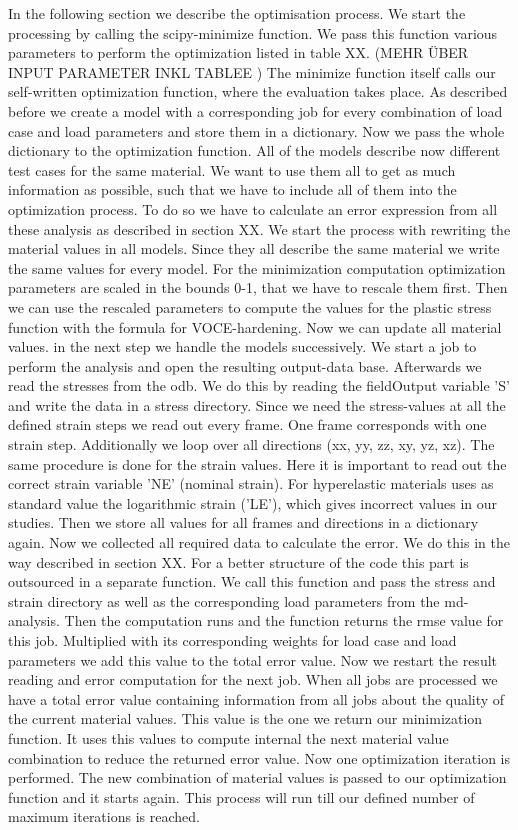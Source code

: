     In the following section we describe the optimisation process. We start the processing by calling the scipy-minimize function. We pass this function various parameters to perform the optimization listed in table XX. (MEHR ÜBER INPUT PARAMETER INKL TABLEE ) The minimize function itself calls our self-written optimization function, where the evaluation takes place. As described before we create a model with a corresponding job for every combination of load case and load parameters and store them in a dictionary. Now we pass the whole dictionary to the optimization function. All of the models describe now different test cases for the same material. We want to use them all to get as much information as possible, such that we have to include all of them into the optimization process. To do so we have to calculate an error expression from all these analysis as described in section XX. 
    We start the process with rewriting the material values in all models. Since they all describe the same material we write the same values for every model. For the minimization computation optimization parameters are scaled in the bounds 0-1, that we have to rescale them first. Then we can use the rescaled parameters to compute the values for the plastic stress function with the formula for VOCE-hardening. Now we can update all material values. in the next step we handle the models successively. We start a job to perform the  analysis and open the resulting output-data base. Afterwards we read the stresses from the odb. We do this by reading the fieldOutput variable 'S' and write the data in a stress directory. Since we need the stress-values at all the defined strain steps we read out every frame. One frame corresponds with one strain step. Additionally we loop over all directions (xx, yy, zz, xy, yz, xz). The same procedure is done for the strain values. Here it is important to read out the correct strain variable 'NE' (nominal strain). For hyperelastic materials  uses as standard value the logarithmic strain ('LE'), which gives incorrect values in our studies. Then we store all values for all frames and directions in a dictionary again. Now we collected all required data to calculate the error. We do this in the way described in section XX. For a better structure of the code this part is outsourced in a separate function. We call this function and pass the stress and strain directory as well as the corresponding load parameters from the md-analysis. Then the computation runs and the function returns the rmse value for this job. Multiplied with its corresponding weights for load case and load parameters we add this value to the total error value. Now we restart the result reading and error computation for the next job. When all jobs are processed we have a total error value containing information from all jobs about the quality of the current material values. This value is the one we return our minimization function. It uses this values to compute internal the next material value combination to reduce the returned error value. Now one optimization iteration is performed. The new combination of material values is passed to our optimization function and it starts again. This process will run till our defined number of maximum iterations is reached. 

